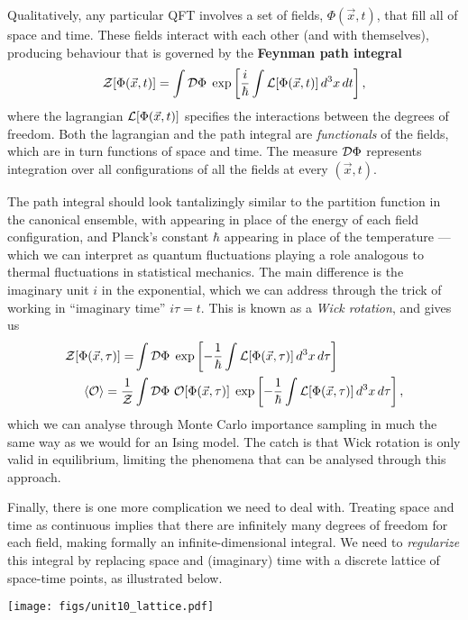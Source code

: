 Qualitatively, any particular QFT involves a set of fields, $\Phi(\vec x, t)$, that fill all of space and time.
These fields interact with each other (and with themselves), producing behaviour that is governed by the \textbf{Feynman path integral}
\begin{equation*}
  \mathcal Z[\Phi(\vec x, t)] = \int \mathcal D \Phi \; \exp\left[\frac{i}{\hbar} \int \mathcal L[\Phi(\vec x, t)] \, d^3x \mathop{dt}\right],
\end{equation*}
where the lagrangian $\mathcal L[\Phi(\vec x, t)]$ specifies the interactions between the degrees of freedom.
Both the lagrangian and the path integral are \textit{functionals} of the fields, which are in turn functions of space and time.
The measure $\mathcal D \Phi$ represents integration over all configurations of all the fields at every $(\vec x, t)$.

The path integral should look tantalizingly similar to the partition function in the canonical ensemble, with \cL appearing in place of the energy of each field configuration, and Planck's constant $\hbar$ appearing in place of the temperature --- which we can interpret as quantum fluctuations playing a role analogous to thermal fluctuations in statistical mechanics.
The main difference is the imaginary unit $i$ in the exponential, which we can address through the trick of working in ``imaginary time'' $i\tau = t$.
This is known as a \textit{Wick rotation}, and gives us
\begin{align*}
  \mathcal Z[\Phi(\vec x, \tau)] = & \int \mathcal D \Phi \; \exp\left[-\frac{1}{\hbar} \int \mathcal L[\Phi(\vec x, \tau)] \, d^3x \mathop{d\tau} \right] \\
  \left\langle \mathcal O \right\rangle  = \frac{1}{\mathcal Z} & \int \mathcal D \Phi \ \mathcal O[\Phi(\vec x, \tau)] \; \exp\left[-\frac{1}{\hbar} \int \mathcal L[\Phi(\vec x, \tau)] \, d^3x \mathop{d\tau} \right],
\end{align*}
which we can analyse through Monte Carlo importance sampling in much the same way as we would for an Ising model.
The catch is that Wick rotation is only valid in equilibrium, limiting the phenomena that can be analysed through this approach.

Finally, there is one more complication we need to deal with.
Treating space and time as continuous implies that there are infinitely many degrees of freedom for each field, making \cZ formally an infinite-dimensional integral.
We need to \textit{regularize} this integral by replacing space and (imaginary) time with a discrete lattice of space-time points, as illustrated below.

\begin{center}\texttt{[image: figs/unit10\_lattice.pdf]}\end{center}

